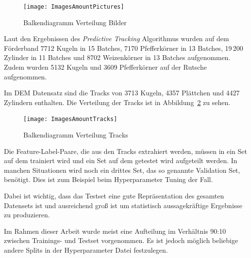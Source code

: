 \begin{figure}[h]
	\centering
	\texttt{[image: ImagesAmountPictures]}
	\caption{Balkendiagramm Verteilung Bilder}
	\label{fig:barPics}
\end{figure}

Laut den Ergebnissen des \textit{Predictive Tracking} Algorithmus wurden auf dem Förderband 
7712 Kugeln in 15 Batches,
7170 Pfefferkörner in 13 Batches,
19\,200 Zylinder in 11 Batches
und 8702 Weizenkörner in 13 Batches aufgenommen.
Zudem wurden 5132 Kugeln und 3609 Pfefferkörner auf der Rutsche aufgenommen.

Im DEM Datensatz sind die Tracks von 3713 Kugeln, 4357 Plättchen und 4427 Zylindern enthalten.
Die Verteilung der Tracks ist in Abbildung~\ref{fig:barTracks} zu sehen.

\begin{figure}[h]
	\centering
	\texttt{[image: ImagesAmountTracks]}
	\caption{Balkendiagramm Verteilung Tracks}
	\label{fig:barTracks}
\end{figure}

Die Feature-Label-Paare, die aus den Tracks extrahiert werden, 
müssen in ein Set auf dem trainiert wird und ein Set auf dem getestet wird aufgeteilt werden.
In manchen Situationen wird noch ein drittes Set, das so genannte Validation Set, benötigt.
Dies ist zum Beispiel beim Hyperparameter Tuning der Fall.

Dabei ist wichtig, dass das Testset eine gute Repräsentation des gesamten Datensets ist 
und ausreichend groß ist um statistisch aussagekräftige Ergebnisse zu produzieren.

Im Rahmen dieser Arbeit wurde meist eine Aufteilung im Verhältnis 90:10 zwischen Trainings- und Testset vorgenommen.
Es ist jedoch möglich beliebige andere Splits in der Hyperparameter Datei festzulegen.









